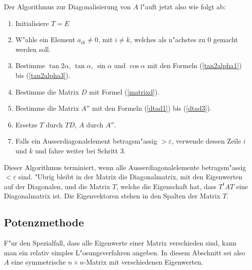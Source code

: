 Der Algorithmus zur Diagonalisierung von $A$ l"auft jetzt also
wie folgt ab:
\begin{enumerate}
\item Initialisiere $T=E$
\item W"ahle ein Element $a_{ik}\ne 0$, mit $i\ne k$, welches als
n"achstes zu $0$ gemacht werden soll.
\item Bestimme $\tan2\alpha$, $\tan\alpha$, $\sin\alpha$ und $\cos\alpha$
mit den Formeln (\ref{tan2alpha1}) bis (\ref{tan2alpha3}).
\item Bestimme die Matrix $D$ mit Formel (\ref{matrixd}).
\item Bestimme die Matrix $A''$ mit den Formeln (\ref{dtad1}) bis
(\ref{dtad3}).
\item Ersetze $T$ durch $TD$, $A$ durch $A''$.
\item Falls ein Ausserdiagonalelement betragsm"assig $>\varepsilon$,
verwende dessen Zeile $i$ und $k$ und fahre weiter bei Schritt 3.
\end{enumerate}
Dieser Algorithmus terminiert, wenn alle Ausserdiagonalelemente 
betragsm"assig $<\varepsilon$ sind. "Ubrig bleibt in der Matrix
die Diagonalmatrix, mit den Eigenwerten auf der Diagonalen, 
und die Matrix $T$, welche die Eigenschaft hat, dass $T^tAT$
eine Diagonalmatrix ist. Die Eigenvektoren stehen in den
Spalten der Matrix $T$.

\subsection{Potenzmethode\label{section:potenzmethode}}
F"ur den Spezialfall, dass alle Eigenwerte einer Matrix verschieden
sind, kann man ein relativ simples L"osungsverfahren angeben. In diesem
Abschnitt sei also $A$ eine symmetrische $n\times n$-Matrix mit
verschiedenen Eigenwerten.
